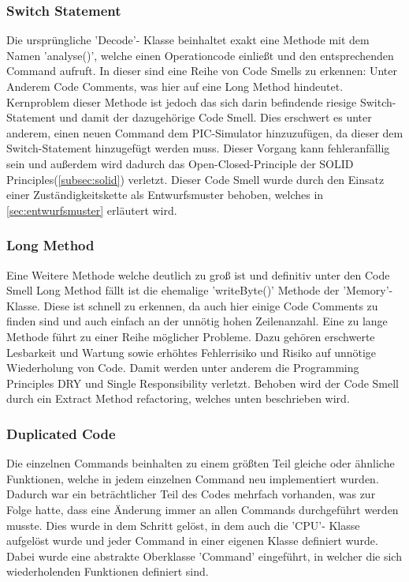 \documentclass[12pt,a4paper,titlepage,ngerman,pdftex]{report}
\begin{document}
	\subsubsection{Switch Statement}
	
	Die ursprüngliche 'Decode'- Klasse beinhaltet exakt eine Methode mit dem Namen 'analyse()', welche einen Operationcode einließt und den entsprechenden Command aufruft. In dieser sind eine Reihe von Code Smells zu erkennen: Unter Anderem Code Comments, was hier auf eine Long Method hindeutet.
	Kernproblem dieser Methode ist jedoch das sich darin befindende riesige Switch-Statement und damit der dazugehörige Code Smell. Dies erschwert es unter anderem, einen neuen Command dem PIC-Simulator hinzuzufügen,
	da dieser dem Switch-Statement hinzugefügt werden muss. Dieser Vorgang kann fehleranfällig sein und außerdem wird dadurch das Open-Closed-Principle der SOLID Principles(\autoref{subsec:solid}) verletzt. 
	Dieser Code Smell wurde durch den Einsatz einer Zuständigkeitskette als Entwurfsmuster behoben, welches in \autoref{sec:entwurfsmuster} erläutert wird.
	
	\subsubsection{Long Method}
	
	Eine Weitere Methode welche deutlich zu groß ist und definitiv unter den Code Smell Long Method fällt ist die ehemalige 'writeByte()' Methode der 'Memory'- Klasse. Diese ist schnell zu erkennen, da auch hier einige Code Comments zu finden sind und auch einfach an der unnötig hohen Zeilenanzahl.
	Eine zu lange Methode führt zu einer Reihe möglicher Probleme. Dazu gehören erschwerte Lesbarkeit und Wartung sowie erhöhtes Fehlerrisiko und Risiko auf unnötige Wiederholung von Code. Damit werden unter anderem die Programming Principles DRY und Single Responsibility verletzt. 
	Behoben wird der Code Smell durch ein Extract Method refactoring, welches unten beschrieben wird.
	
	\subsubsection{Duplicated Code}\label{subsubsec:duplicated_code}
	
	Die einzelnen Commands beinhalten zu einem größten Teil gleiche oder ähnliche Funktionen, welche in jedem einzelnen Command neu implementiert wurden. Dadurch war ein beträchtlicher Teil des Codes mehrfach vorhanden, was zur Folge hatte,
	dass eine Änderung immer an allen Commands durchgeführt werden musste. Dies wurde in dem Schritt gelöst, in dem auch die 'CPU'- Klasse aufgelöst wurde und jeder Command in einer eigenen Klasse definiert wurde. 
	Dabei wurde eine abstrakte Oberklasse 'Command' eingeführt, in welcher die sich wiederholenden Funktionen definiert sind.
	
\end{document}
